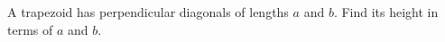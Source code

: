 A trapezoid has perpendicular diagonals of lengths $a$ and $b$. Find its height in terms of $a$ and $b$.
